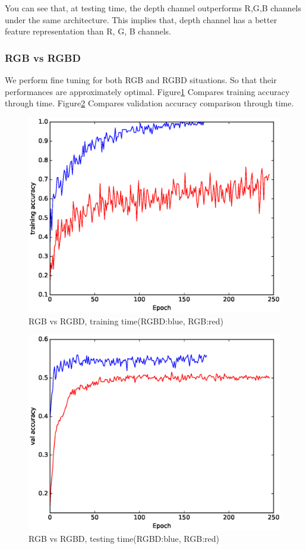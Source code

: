 \documentclass[10pt,twocolumn,letterpaper]{article}
\begin{document}
You can see that, at testing time, the depth channel outperforms R,G,B channels under the same architecture.
This implies that, depth channel has a better feature representation than R, G, B channels.

\subsubsection{RGB vs RGBD}
We perform fine tuning for both RGB and RGBD situations.
 So that their performances are approximately optimal.
Figure\ref{fig:mixtrain} Compares training accuracy  through time. 
Figure\ref{fig:mixtest} Compares validation accuracy comparison through time. 
\begin{figure}
\includegraphics[width=\linewidth]{../presentation/together_train.eps}
\caption{RGB vs RGBD, training time(RGBD:blue, RGB:red)}
\label{fig:mixtrain}
\end{figure}
\begin{figure}
\includegraphics[width=\linewidth]{../presentation/together_test.eps}
\caption{RGB vs RGBD, testing time(RGBD:blue, RGB:red)}
\label{fig:mixtest}
\end{figure}
\end{document}
